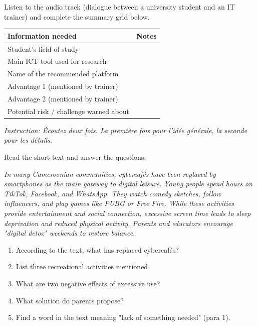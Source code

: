 \documentclass[11pt]{article}
\begin{document}
\begin{exercice}
Listen to the audio track (dialogue between a university student and an IT trainer) and complete the summary grid below.

\begin{center}
\begin{tabularx}{\linewidth}{|l|X|}\hline
\textbf{Information needed} & \textbf{Notes} \\\hline
Student's field of study & \dotfill \\\hline
Main ICT tool used for research & \dotfill \\\hline
Name of the recommended platform & \dotfill \\\hline
Advantage 1 (mentioned by trainer) & \dotfill \\\hline
Advantage 2 (mentioned by trainer) & \dotfill \\\hline
Potential risk / challenge warned about & \dotfill \\\hline
\end{tabularx}
\end{center}
\textit{Instruction: Écoutez deux fois. La première fois pour l'idée générale, la seconde pour les détails.}
\end{exercice}

\begin{exercice}
Read the short text and answer the questions.

\textit{In many Cameroonian communities, cybercafés have been replaced by smartphones as the main gateway to digital leisure. Young people spend hours on TikTok, Facebook, and WhatsApp. They watch comedy sketches, follow influencers, and play games like PUBG or Free Fire. While these activities provide entertainment and social connection, excessive screen time leads to sleep deprivation and reduced physical activity. Parents and educators encourage "digital detox" weekends to restore balance.}

\begin{enumerate}
\item According to the text, what has replaced cybercafés? \dotfill
\item List three recreational activities mentioned. \dotfill
\item What are two negative effects of excessive use? \dotfill
\item What solution do parents propose? \dotfill
\item Find a word in the text meaning "lack of something needed" (para 1). \dotfill
\end{enumerate}
\end{exercice}
\end{document}
